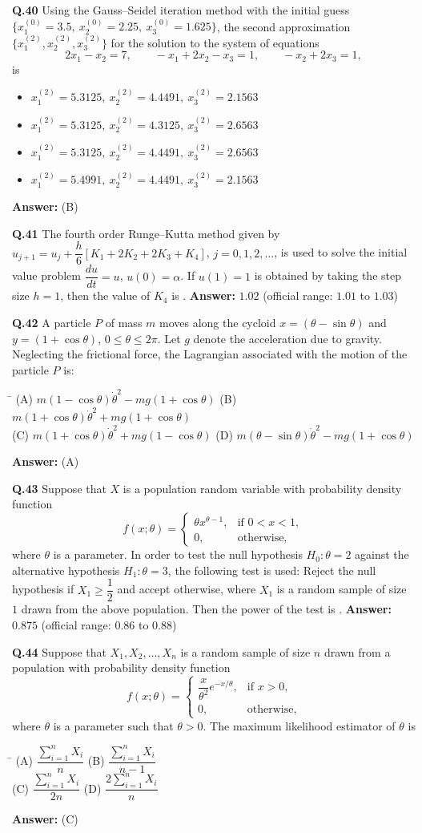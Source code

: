 \documentclass[11pt,a4paper]{article}
\newcommand{\optsfourA}[4]{%
  \begin{tabbing}
    \hspace{0.48\linewidth}\=\kill
    (A) #1 \> (B) #2 \\[2pt]
    (C) #3 \> (D) #4
  \end{tabbing}%
}
\newcommand{\optslistA}[4]{%
  \begin{itemize}
    \setlength{\itemsep}{2pt}\setlength{\parskip}{0pt}
    \item[(A)] #1
    \item[(B)] #2
    \item[(C)] #3
    \item[(D)] #4
  \end{itemize}%
}
\newcommand{\ans}[1]{\textbf{Answer:} #1\par\medskip}
\begin{document}
\textbf{Q.40} Using the Gauss--Seidel iteration method with the initial guess $\{x_1^{(0)} = 3.5,\ x_2^{(0)} = 2.25,\ x_3^{(0)} = 1.625\}$, the second approximation $\{x_1^{(2)}, x_2^{(2)}, x_3^{(2)}\}$ for the solution to the system of equations
\[
  2x_1 - x_2 = 7, \qquad -x_1 + 2x_2 - x_3 = 1, \qquad -x_2 + 2x_3 = 1,
\]
is
\optslistA{$x_1^{(2)} = 5.3125,\ x_2^{(2)} = 4.4491,\ x_3^{(2)} = 2.1563$}{$x_1^{(2)} = 5.3125,\ x_2^{(2)} = 4.3125,\ x_3^{(2)} = 2.6563$}{$x_1^{(2)} = 5.3125,\ x_2^{(2)} = 4.4491,\ x_3^{(2)} = 2.6563$}{$x_1^{(2)} = 5.4991,\ x_2^{(2)} = 4.4491,\ x_3^{(2)} = 2.1563$}
\ans{(B)}

\textbf{Q.41} The fourth order Runge--Kutta method given by $u_{j+1} = u_j + \dfrac{h}{6}[K_1 + 2K_2 + 2K_3 + K_4]$, $j = 0, 1, 2, \dots$, is used to solve the initial value problem $\dfrac{du}{dt} = u$, $u(0) = \alpha$. If $u(1) = 1$ is obtained by taking the step size $h = 1$, then the value of $K_4$ is \underline{\hspace{2cm}}.
\ans{$1.02$ (official range: $1.01$ to $1.03$)}

\textbf{Q.42} A particle $P$ of mass $m$ moves along the cycloid $x = (\theta - \sin\theta)$ and $y = (1 + \cos\theta)$, $0 \le \theta \le 2\pi$. Let $g$ denote the acceleration due to gravity. Neglecting the frictional force, the Lagrangian associated with the motion of the particle $P$ is:
\optsfourA{$m(1 - \cos\theta)\dot{\theta}^2 - mg(1 + \cos\theta)$}{$m(1 + \cos\theta)\dot{\theta}^2 + mg(1 + \cos\theta)$}{$m(1 + \cos\theta)\dot{\theta}^2 + mg(1 - \cos\theta)$}{$m(\theta - \sin\theta)\dot{\theta}^2 - mg(1 + \cos\theta)$}
\ans{(A)}

\textbf{Q.43} Suppose that $X$ is a population random variable with probability density function
\[
  f(x; \theta) = \begin{cases} \theta x^{\theta - 1}, & \text{if } 0 < x < 1, \\ 0, & \text{otherwise,} \end{cases}
\]
where $\theta$ is a parameter. In order to test the null hypothesis $H_0 : \theta = 2$ against the alternative hypothesis $H_1 : \theta = 3$, the following test is used: Reject the null hypothesis if $X_1 \ge \dfrac{1}{2}$ and accept otherwise, where $X_1$ is a random sample of size $1$ drawn from the above population. Then the power of the test is \underline{\hspace{2cm}}.
\ans{$0.875$ (official range: $0.86$ to $0.88$)}

\textbf{Q.44} Suppose that $X_1, X_2, \dots, X_n$ is a random sample of size $n$ drawn from a population with probability density function
\[
  f(x; \theta) = \begin{cases} \dfrac{x}{\theta^2}e^{-x/\theta}, & \text{if } x > 0, \\ 0, & \text{otherwise,} \end{cases}
\]
where $\theta$ is a parameter such that $\theta > 0$. The maximum likelihood estimator of $\theta$ is
\optsfourA{$\dfrac{\sum_{i=1}^n X_i}{n}$}{$\dfrac{\sum_{i=1}^n X_i}{n - 1}$}{$\dfrac{\sum_{i=1}^n X_i}{2n}$}{$\dfrac{2\sum_{i=1}^n X_i}{n}$}
\ans{(C)}
\end{document}
